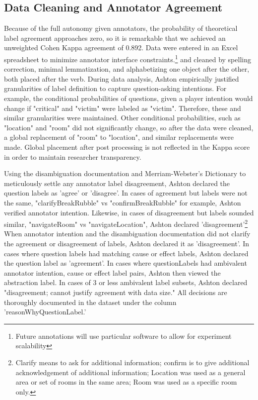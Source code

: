 \documentclass[10pt]{article}
\begin{document}
\subsection{Data Cleaning and Annotator Agreement}
Because of the full autonomy given annotators, the probability of theoretical label agreement approaches zero, so it is remarkable that we achieved an unweighted Cohen Kappa agreement of 0.892. Data were entered in an Excel spreadsheet to minimize annotator interface constraints.\footnote{Future annotations will use particular software to allow for experiment scalability} and cleaned by spelling correction, minimal lemmatization, and alphabetizing one object after the other, both placed after the verb. During data analysis, Ashton empirically justified granularities of label definition to capture question-asking intentions. For example, the conditional probabilities of questions, given a player intention would change if "critical" and "victim" were labeled as "victim". Therefore, these and similar granularities were maintained. Other conditional probabilities, such as "location" and "room" did not significantly change, so after the data were cleaned, a global replacement of "room" to "location", and similar replacements were made. Global placement after post processing is not reflected in the Kappa score in order to maintain researcher transparency.

Using the disambiguation documentation and Merriam-Webster's Dictionary to meticulously settle any annotator label disagreement, Ashton declared the question labels as 'agree' or 'disagree'. In cases of agreement but labels were not the same, "clarifyBreakRubble" vs "confirmBreakRubble" for example, Ashton verified annotator intention. Likewise, in cases of disagreement but labels sounded similar, "navigateRoom" vs "navigateLocation", Ashton declared 'disagreement'\footnote{Clarify means to ask for additional information; confirm is to give additional acknowledgement of additional information; Location was used as a general area or set of rooms in the same area; Room was used as a specific room only.} When annotator intention and the disambiguation documentation did not clarify the agreement or disagreement of labels, Ashton declared it as 'disagreement'. In cases where question labels had matching cause or effect labels, Ashton declared the question label as 'agreement'. In cases where questionLabels had ambivalent annotator intention, cause or effect label pairs, Ashton then viewed the abstraction label. In cases of 3 or less ambivalent label subsets, Ashton declared "disagreement; cannot justify agreement with data size." All decisions are thoroughly documented in the dataset under the column 'reasonWhyQuestionLabel.' 
\end{document}

